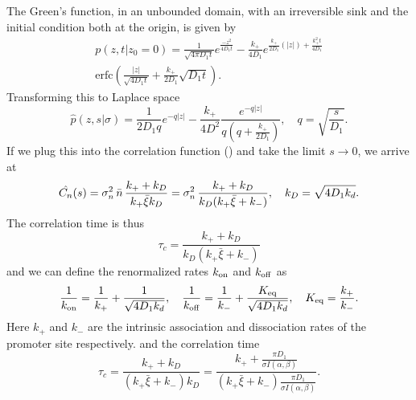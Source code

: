 The Green's function, in an unbounded domain, with an irreversible sink and the initial condition both at the origin, is given by
\begin{multline}
 p(z,t|z_0=0) = \frac{1}{\sqrt{4 \pi D_1 t}}e^{\frac{-z^2}{4 D_1 t}} - \frac{k_+}{4 D_1}e^{\frac{k_+}{2 D_1}(|z|)+\frac{k_+^2 t}{4 D_1}} \\
\mathrm{erfc}\left( \frac{|z|}{\sqrt{4 D_1 t}}+\frac{k_+}{2 D_1}\sqrt{D_1 t} \right).
\end{multline}
Transforming this to Laplace space
\begin{equation}
 \hat{p}(z,s|\sigma) = \frac{1}{2 D_1 q}e^{-q|z|} - \frac{k_+}{4 D^2}\frac{e^{-q|z|}}{q(q+\frac{k_+}{2 D_1})}, \quad q=\sqrt{\frac{s}{D_1}}.
\end{equation}
If we plug this into the correlation function () and take the limit $s \to 0$, we arrive at
\begin{equation}
 \hat{C_n}(s) = \sigma_n^2 \, \bar{n} \, \frac{k_+ + k_D}{k_+ \bar{\xi} k_D} = \sigma_n^2 \, \frac{k_+ + k_D}{k_D (k_+ \bar{\xi} + k_-)}, \quad k_D = \sqrt{4 D_1 k_d}.
 \elabel{LapCorr25D}
\end{equation}
The correlation time is thus
\begin{equation}
 \tau_c = \frac{k_+ + k_D}{k_D (k_+ \bar{\xi} + k_-)}
\end{equation}
and we can define the renormalized rates $k_{\rm on}$ and $k_{\rm off}$ as
\begin{equation}
 \frac{1}{k_{\rm on}} = \frac{1}{k_+} + \frac{1}{\sqrt{4 D_1 k_d}}, \quad \frac{1}{k_{\rm off}} = \frac{1}{k_-} + \frac{K_{\rm eq}}{\sqrt{4 D_1 k_d}}, \quad K_{\rm eq} = \frac{k_+}{k_-}.
\end{equation}
Here $k_+$ and $k_-$ are the intrinsic association and dissociation rates of the promoter site respectively. 
and the correlation time
\begin{equation}
 \tau_c = \frac{k_+ + k_D}{(k_+ \bar{\xi} + k_-) k_D} = \frac{k_+ + \frac{\pi D_1}{\sigma I(\alpha,\beta)}}{(k_+ \bar{\xi} + k_-) \frac{\pi D_1}{\sigma I(\alpha,\beta)}}.
\end{equation}